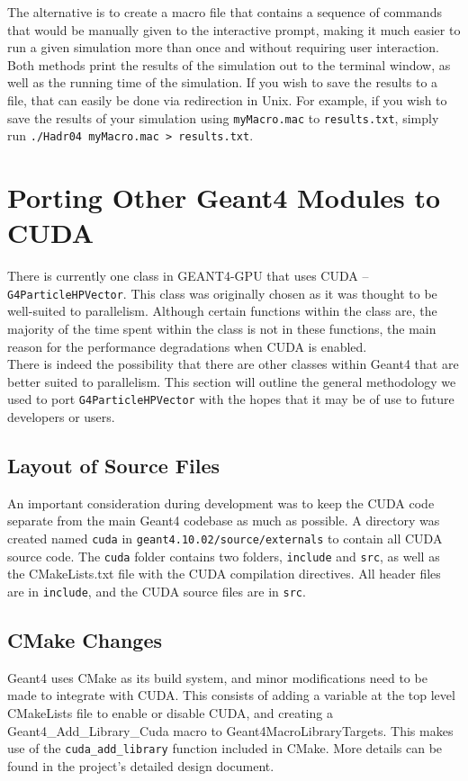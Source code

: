 \documentclass[12pt]{article}
\begin{document}
The alternative is to create a macro file that contains a sequence of commands that would be manually given to the interactive prompt, making it much easier to run a given simulation more than once and without requiring user interaction. Both methods print the results of the simulation out to the terminal window, as well as the running time of the simulation. If you wish to save the results to a file, that can easily be done via redirection in Unix. For example, if you wish to save the results of your simulation using \texttt{myMacro.mac} to \texttt{results.txt}, simply run \texttt{./Hadr04 myMacro.mac > results.txt}.

\section{Porting Other Geant4 Modules to CUDA} \label{SecDev} %
There is currently one class in GEANT4-GPU that uses CUDA -- \texttt{G4ParticleHPVector}. This class was originally chosen as it was thought to be well-suited to parallelism. Although certain functions within the class are, the majority of the time spent within the class is not in these functions, the main reason for the performance degradations when CUDA is enabled.\\

There is indeed the possibility that there are other classes within Geant4 that are better suited to parallelism. This section will outline the general methodology we used to port \texttt{G4ParticleHPVector} with the hopes that it may be of use to future developers or users.

\subsection{Layout of Source Files} %
An important consideration during development was to keep the CUDA code separate from the main Geant4 codebase as much as possible. A directory was created named \texttt{cuda} in \texttt{geant4.10.02/source/externals} to contain all CUDA source code. The \texttt{cuda} folder contains two folders, \texttt{include} and \texttt{src}, as well as the CMakeLists.txt file with the CUDA compilation directives. All header files are in \texttt{include}, and the CUDA source files are in \texttt{src}.

\subsection{CMake Changes} %
Geant4 uses CMake as its build system, and minor modifications need to be made to integrate with CUDA. This consists of adding a variable at the top level CMakeLists file to enable or disable CUDA, and creating a {Geant4\_Add\_Library\_Cuda} macro to Geant4MacroLibraryTargets. This makes use of the \texttt{cuda\_add\_library} function included in CMake. More details can be found in the project's detailed design document.
\end{document}
